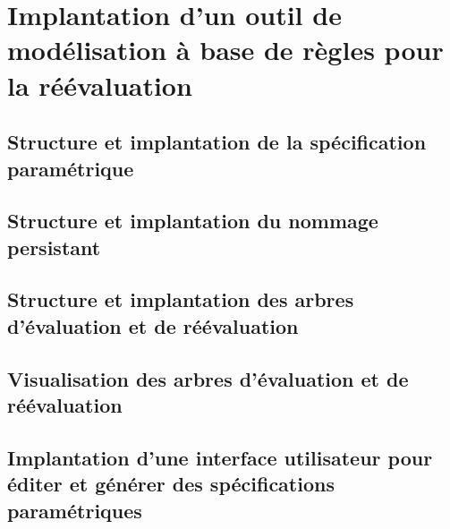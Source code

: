 
\chapter[Implantation d'un outil de modélisation à base de règles pour la réévaluation]{Implantation d'un outil de modélisation à base de règles pour la réévaluation}
\label{cha:impl-outil-reevaluation}

\section[Structure et implantation de la spécification paramétrique]{Structure et implantation de la spécification paramétrique}
\label{sec:implantation-specification-parametrique}

\section[Structure et implantation du nommage persistant]{Structure et implantation du nommage persistant}
\label{sec:implantation-nommage-persistant}

\section[Structure et implantation des arbres d'évaluation et de réévaluation]{Structure et implantation des arbres d'évaluation et de réévaluation}
\label{sec:implantation-arbre}

\section[Visualisation des arbres d'évaluation et de réévaluation]{Visualisation des arbres d'évaluation et de réévaluation}
\label{sec:implantation-visualisation-arbres}

\section[Implantation d'une interface utilisateur pour éditer et générer des spécifications paramétriques]{Implantation d'une interface utilisateur pour éditer et générer des spécifications paramétriques}
\label{sec:implantation-interface-utilisateur}

